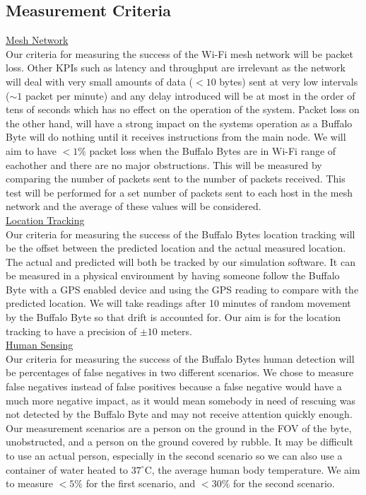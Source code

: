 \documentclass[10pt]{article}
\begin{document}
\subsection*{Measurement Criteria}
\underline{Mesh Network}\\[0.25\baselineskip]
Our criteria for measuring the success of the Wi-Fi mesh network will be packet loss. Other KPIs such as latency and throughput are irrelevant as the network will deal with very small amounts of data ($< 10$ bytes) sent at very low intervals ($\sim1$ packet per minute) and any delay introduced will be at most in the order of tens of seconds which has no effect on the operation of the system. Packet loss on the other hand, will have a strong impact on the systems operation as a Buffalo Byte will do nothing until it receives instructions from the main node. We will aim to have $<1\%$ packet loss when the Buffalo Bytes are in Wi-Fi range of eachother and there are no major obstructions. This will be measured by comparing the number of packets sent to the number of packets received. This test will be performed for a set number of packets sent to each host in the mesh network and the average of these values will be considered.\\[0.5\baselineskip]
\underline{Location Tracking}\\[0.25\baselineskip]
Our criteria for measuring the success of the Buffalo Bytes location tracking will be the offset between the predicted location and the actual measured location. The actual and predicted will both be tracked by our simulation software. It can be measured in a physical environment by having someone follow the Buffalo Byte with a GPS enabled device and using the GPS reading to compare with the predicted location. We will take readings after 10 minutes of random movement by the Buffalo Byte so that drift is accounted for. Our aim is for the location tracking to have a precision of $\pm10$ meters.\\[0.5\baselineskip]
\underline{Human Sensing}\\[0.25\baselineskip]
Our criteria for measuring the success of the Buffalo Bytes human detection will be percentages of false negatives in two different scenarios. We chose to measure false negatives instead of false positives because a false negative would have a much more negative impact, as it would mean somebody in need of rescuing was not detected by the Buffalo Byte and may not receive attention quickly enough. Our measurement scenarios are a person on the ground in the FOV of the byte, unobstructed, and a person on the ground covered by rubble. It may be difficult to use an actual person, especially in the second scenario so we can also use a container of water heated to $37^\circ$C, the average human body temperature. We aim to measure $<5\%$ for the first scenario, and $<30\%$ for the second scenario.\\[0.5\baselineskip]
\end{document}
